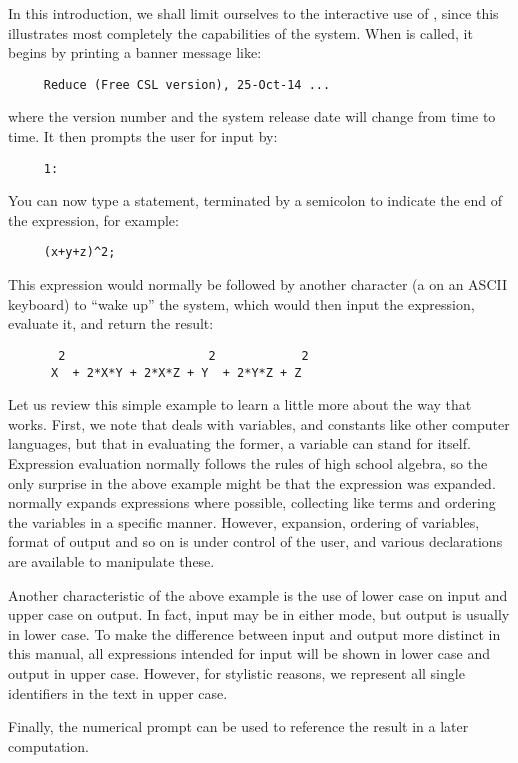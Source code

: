 In this introduction, we shall limit ourselves to the interactive use of
{\REDUCE}, since this illustrates most completely the capabilities of the
system. When {\REDUCE} is called, it begins by printing a banner message
like:
\begin{verbatim}
     Reduce (Free CSL version), 25-Oct-14 ...
\end{verbatim}
where the version number and the system release date will change from time
to time. It then prompts the user for input by:
\begin{verbatim}
     1:
\end{verbatim}
You can now type a {\REDUCE} statement, terminated by a semicolon to indicate
the end of the expression, for example:
\begin{verbatim}
     (x+y+z)^2;
\end{verbatim}
This expression would normally be followed by another character (a
 on an ASCII keyboard) to ``wake up'' the system, which would
then input the expression, evaluate it, and return the result:
\begin{verbatim}
       2                    2            2
      X  + 2*X*Y + 2*X*Z + Y  + 2*Y*Z + Z
\end{verbatim}
Let us review this simple example to learn a little more about the way that
{\REDUCE} works. First, we note that {\REDUCE} deals with variables, and
constants like other computer languages, but that in evaluating the former,
a variable can stand for itself. Expression evaluation normally follows
the rules of high school algebra, so the only surprise in the above example
might be that the expression was expanded. {\REDUCE} normally expands
expressions where possible, collecting like terms and ordering the
variables in a specific manner. However, expansion, ordering of variables,
format of output and so on is under control of the user, and various
declarations are available to manipulate these.

Another characteristic of the above example is the use of lower case on
input and upper case on output.  In fact, input may be in either mode, but
output is usually in lower case.  To make the difference between input and
output more distinct in this manual, all expressions intended for input
will be shown in lower case and output in upper case.  However, for
stylistic reasons, we represent all single identifiers in the text in
upper case.

Finally, the numerical prompt can be used to reference the result in a
later computation.

